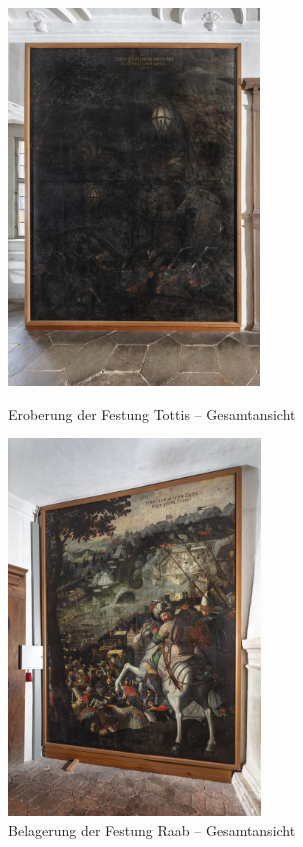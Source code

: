 \documentclass[
  a4paper,
]{book}
\begin{document}
\begin{figure}
\includegraphics[height=10cm]{images/fmd10005851a.jpg}

\caption{Eroberung der Festung Tottis – Gesamtansicht}
\label{fig:{images/fmd10005851a.jpg}}

\clearpage

\centering

\includegraphics[height=10cm]{images/fmd10005843a.jpg}

\caption{Belagerung der Festung Raab – Gesamtansicht}
\label{fig:{images/fmd10005843a.jpg}}

\clearpage

\centering


\end{figure}
\end{document}

